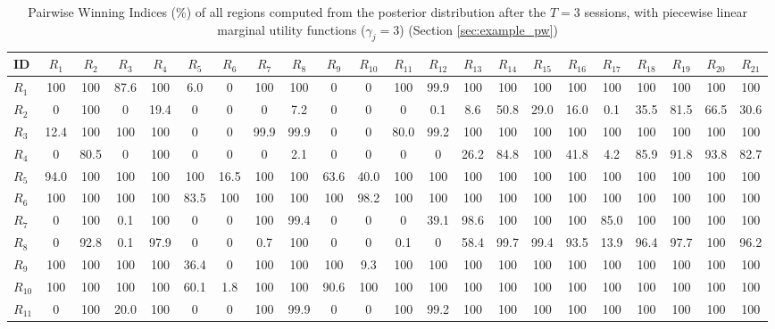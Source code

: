 \begin{table}[h!]
\centering
\footnotesize
\caption{Pairwise Winning Indices (\%) of all regions computed from the posterior distribution after the $T=3$ sessions, with piecewise linear marginal utility functions ($\gamma_j=3$) (Section \ref{sec:example_pw})}
\label{tab:PWI_pw_t3}
\begin{tabularx}{\textwidth}{X|CCCCCCCCCCCCCCCCCCCCC}
\toprule
ID&$R_{1}$&$R_{2}$&$R_{3}$&$R_{4}$&$R_{5}$&$R_{6}$&$R_{7}$&$R_{8}$&$R_{9}$&$R_{10}$&$R_{11}$&$R_{12}$&$R_{13}$&$R_{14}$&$R_{15}$&$R_{16}$&$R_{17}$&$R_{18}$&$R_{19}$&$R_{20}$&$R_{21}$\\
\midrule
$R_{1}$ & 100 & 100 & 87.6 & 100 & 6.0 & 0 & 100 & 100 & 0 & 0 & 100 & 99.9 & 100 & 100 & 100 & 100 & 100 & 100 & 100 & 100 & 100 \\
$R_{2}$ & 0 & 100 & 0 & 19.4 & 0 & 0 & 0 & 7.2 & 0 & 0 & 0 & 0.1 & 8.6 & 50.8 & 29.0 & 16.0 & 0.1 & 35.5 & 81.5 & 66.5 & 30.6 \\
$R_{3}$ & 12.4 & 100 & 100 & 100 & 0 & 0 & 99.9 & 99.9 & 0 & 0 & 80.0 & 99.2 & 100 & 100 & 100 & 100 & 100 & 100 & 100 & 100 & 100 \\
$R_{4}$ & 0 & 80.5 & 0 & 100 & 0 & 0 & 0 & 2.1 & 0 & 0 & 0 & 0 & 26.2 & 84.8 & 100 & 41.8 & 4.2 & 85.9 & 91.8 & 93.8 & 82.7 \\
$R_{5}$ & 94.0 & 100 & 100 & 100 & 100 & 16.5 & 100 & 100 & 63.6 & 40.0 & 100 & 100 & 100 & 100 & 100 & 100 & 100 & 100 & 100 & 100 & 100 \\
$R_{6}$ & 100 & 100 & 100 & 100 & 83.5 & 100 & 100 & 100 & 100 & 98.2 & 100 & 100 & 100 & 100 & 100 & 100 & 100 & 100 & 100 & 100 & 100 \\
$R_{7}$ & 0 & 100 & 0.1 & 100 & 0 & 0 & 100 & 99.4 & 0 & 0 & 0 & 39.1 & 98.6 & 100 & 100 & 100 & 85.0 & 100 & 100 & 100 & 100 \\
$R_{8}$ & 0 & 92.8 & 0.1 & 97.9 & 0 & 0 & 0.7 & 100 & 0 & 0 & 0.1 & 0 & 58.4 & 99.7 & 99.4 & 93.5 & 13.9 & 96.4 & 97.7 & 100 & 96.2 \\
$R_{9}$ & 100 & 100 & 100 & 100 & 36.4 & 0 & 100 & 100 & 100 & 9.3 & 100 & 100 & 100 & 100 & 100 & 100 & 100 & 100 & 100 & 100 & 100 \\
$R_{10}$ & 100 & 100 & 100 & 100 & 60.1 & 1.8 & 100 & 100 & 90.6 & 100 & 100 & 100 & 100 & 100 & 100 & 100 & 100 & 100 & 100 & 100 & 100 \\
$R_{11}$ & 0 & 100 & 20.0 & 100 & 0 & 0 & 100 & 99.9 & 0 & 0 & 100 & 99.2 & 100 & 100 & 100 & 100 & 100 & 100 & 100 & 100 & 100 \\

\end{tabularx}
\end{table}
